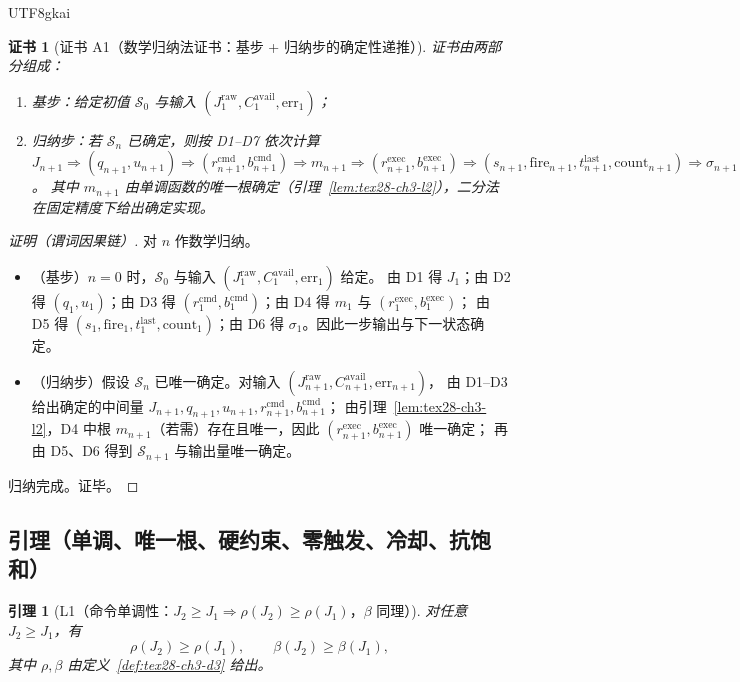 \documentclass[12pt]{article}
\newtheorem{lemma}{引理}[section]
\newtheorem{Certificate}{证书}[section]
\begin{document}
\begin{CJK*}{UTF8}{gkai}
\begin{Certificate}[证书 A1（数学归纳法证书：基步 + 归纳步的确定性递推）]
\label{cert:tex28-ch3-a1}
证书由两部分组成：
\begin{enumerate}
  \item 基步：给定初值 $\mathcal{S}_0$ 与输入 $(J^{\mathrm{raw}}_1,C^{\mathrm{avail}}_1,\mathrm{err}_1)$；
  \item 归纳步：若 $\mathcal{S}_n$ 已确定，则按 D1--D7 依次计算 $J_{n+1}\Rightarrow(q_{n+1},u_{n+1})\Rightarrow(r^{\mathrm{cmd}}_{n+1},
    b^{\mathrm{cmd}}_{n+1})\Rightarrow m_{n+1}\Rightarrow(r^{\mathrm{exec}}_{n+1},b^{\mathrm{exec}}_{n+1})
    \Rightarrow(s_{n+1},\mathrm{fire}_{n+1},t^{\mathrm{last}}_{n+1},\mathrm{count}_{n+1})\Rightarrow\sigma_{n+1}$。
  其中 $m_{n+1}$ 由单调函数的唯一根确定（引理~\ref{lem:tex28-ch3-l2}），二分法在固定精度下给出确定实现。
\end{enumerate}
\end{Certificate}

\begin{proof}[证明（谓词因果链）]
对 $n$ 作数学归纳。
\begin{itemize}
  \item（基步）$n=0$ 时，$\mathcal{S}_0$ 与输入 $(J^{\mathrm{raw}}_1,C^{\mathrm{avail}}_1,\mathrm{err}_1)$ 给定。
  由 D1 得 $J_1$；由 D2 得 $(q_1,u_1)$；由 D3 得 $(r^{\mathrm{cmd}}_1,b^{\mathrm{cmd}}_1)$；由 D4 得 $m_1$ 与 $(r^{\mathrm{exec}}_1,
    b^{\mathrm{exec}}_1)$；
  由 D5 得 $(s_1,\mathrm{fire}_1,t^{\mathrm{last}}_1,\mathrm{count}_1)$；由 D6 得 $\sigma_1$。因此一步输出与下一状态确定。
  \item（归纳步）假设 $\mathcal{S}_n$ 已唯一确定。对输入 $(J^{\mathrm{raw}}_{n+1},C^{\mathrm{avail}}_{n+1},\mathrm{err}_{n+1})$，
  由 D1--D3 给出确定的中间量 $J_{n+1},q_{n+1},u_{n+1},r^{\mathrm{cmd}}_{n+1},b^{\mathrm{cmd}}_{n+1}$；
  由引理~\ref{lem:tex28-ch3-l2}，D4 中根 $m_{n+1}$（若需）存在且唯一，因此 $(r^{\mathrm{exec}}_{n+1},b^{\mathrm{exec}}_{n+1})$ 唯一确定；
  再由 D5、D6 得到 $\mathcal{S}_{n+1}$ 与输出量唯一确定。
\end{itemize}
归纳完成。证毕。
\end{proof}

\subsection{引理（单调、唯一根、硬约束、零触发、冷却、抗饱和）}
\label{subsec:tex28-ch3-lemmas}

\begin{lemma}[L1（命令单调性：$J_2\ge J_1\Rightarrow \rho(J_2)\ge\rho(J_1)$，$\beta$ 同理）]
\label{lem:tex28-ch3-l1}
对任意 $J_2\ge J_1$，有
\[
  \rho(J_2)\ge \rho(J_1),
  \qquad
  \beta(J_2)\ge \beta(J_1),
\]
其中 $\rho,\beta$ 由定义~\ref{def:tex28-ch3-d3} 给出。
\end{lemma}


\end{CJK*}
\end{document}
